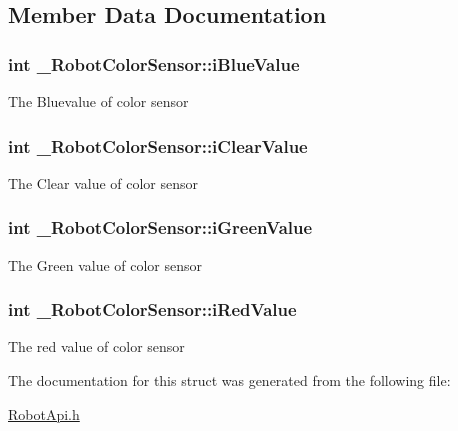 \subsection{Member Data Documentation}
\hypertarget{struct__RobotColorSensor_ad5c72e4e33a2447d6514d1d5a13dc036}{
\subsubsection[{i\+Blue\+Value}]{\setlength{\rightskip}{0pt plus 5cm}int \+\_\+\+Robot\+Color\+Sensor\+::i\+Blue\+Value}}\label{struct__RobotColorSensor_ad5c72e4e33a2447d6514d1d5a13dc036}
The Bluevalue of color sensor \hypertarget{struct__RobotColorSensor_afc18a2ae43409d1b74340f6f9d9fb677}{
\subsubsection[{i\+Clear\+Value}]{\setlength{\rightskip}{0pt plus 5cm}int \+\_\+\+Robot\+Color\+Sensor\+::i\+Clear\+Value}}\label{struct__RobotColorSensor_afc18a2ae43409d1b74340f6f9d9fb677}
The Clear value of color sensor \hypertarget{struct__RobotColorSensor_acfeb66d972f8c3ab2a5982fd4aa3f630}{
\subsubsection[{i\+Green\+Value}]{\setlength{\rightskip}{0pt plus 5cm}int \+\_\+\+Robot\+Color\+Sensor\+::i\+Green\+Value}}\label{struct__RobotColorSensor_acfeb66d972f8c3ab2a5982fd4aa3f630}
The Green value of color sensor \hypertarget{struct__RobotColorSensor_a38b270be1ee87849b7469d100e335314}{
\subsubsection[{i\+Red\+Value}]{\setlength{\rightskip}{0pt plus 5cm}int \+\_\+\+Robot\+Color\+Sensor\+::i\+Red\+Value}}\label{struct__RobotColorSensor_a38b270be1ee87849b7469d100e335314}
The red value of color sensor 

The documentation for this struct was generated from the following file\+:\begin{DoxyCompactItemize}
\item 
\hyperlink{RobotApi_8h}{Robot\+Api.\+h}\end{DoxyCompactItemize}

